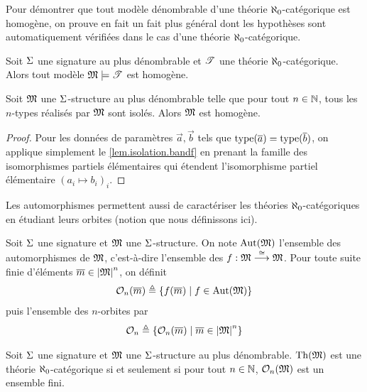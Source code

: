 Pour démontrer que tout modèle dénombrable d'une théorie $\aleph_0$-catégorique
est homogène, on prouve en fait un fait plus général dont les hypothèses sont
automatiquement vérifiées dans le cas d'une théorie $\aleph_0$-catégorique.

\begin{proposition}\label{prop.homogene.cat}
  Soit $\Sigma$ une signature au plus dénombrable et $\mathscr T$ une théorie
  $\aleph_0$-catégorique. Alors tout modèle $\mathfrak{M}\models\mathscr T$ est
  homogène.
\end{proposition}

\begin{lemma}
  Soit $\mathfrak{M}$ une $\Sigma$-structure au plus dénombrable telle que pour tout
  $n \in \mathbb N$, tous les $n$-types réalisés par $\mathfrak{M}$ sont isolés. Alors
  $\mathfrak{M}$ est homogène.
\end{lemma}

\begin{proof}
  Pour les données de paramètres $\vec a,\vec b$ tels que
  $\operatorname{type}(\overline{a}) = \operatorname{type}(\overline{b})$, on applique simplement le
  \cref{lem.isolation.bandf} en prenant la famille des isomorphismes partiels
  élémentaires qui étendent l'isomorphisme partiel élémentaire
  $(a_i \mapsto b_i)_i$.
\end{proof}

Les automorphismes permettent aussi de caractériser les théories
$\aleph_0$-catégoriques en étudiant leurs orbites (notion que nous définissons
ici).

\begin{definition}
  Soit $\Sigma$ une signature et $\mathfrak{M}$ une $\Sigma$-structure. On note
  $\operatorname{Aut}(\mathfrak{M})$ l'ensemble des automorphismes de $\mathfrak{M}$, c'est-à-dire
  l'ensemble des $f : \displaystyle \mathfrak{M} \overset{\cong}{\longrightarrow} \mathfrak{M}$. Pour toute suite
  finie d'éléments $\overline{m}\in\left\vert \mathfrak{M}\right\vert^n$, on définit
  \[\mathcal{O}_n(\overline{m}) \triangleq \left\{ f(\overline{m}) \;\middle\vert\; f\in\operatorname{Aut}(\mathfrak{M}) \right\}\]
  puis l'ensemble des $n$-orbites par
  \[\mathcal{O}_n \triangleq \left\{ \mathcal{O}_n(\overline{m}) \;\middle\vert\; \overline{m} \in \left\vert \mathfrak{M}\right\vert^n \right\}\]
\end{definition}

\begin{proposition}
  Soit $\Sigma$ une signature et $\mathfrak{M}$ une $\Sigma$-structure au plus
  dénombrable. $\operatorname{Th}(\mathfrak{M})$ est une théorie $\aleph_0$-catégorique si et
  seulement si pour tout $n \in \mathbb N$, $\mathcal{O}_n(\mathfrak{M})$ est un ensemble fini.
\end{proposition}

